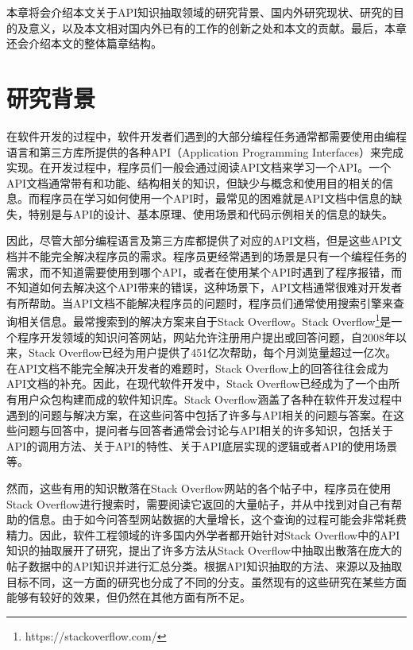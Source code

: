 本章将会介绍本文关于API知识抽取领域的研究背景、国内外研究现状、研究的目的及意义，以及本文相对国内外已有的工作的创新之处和本文的贡献。最后，本章还会介绍本文的整体篇章结构。

\section{研究背景}
在软件开发的过程中，软件开发者们遇到的大部分编程任务通常都需要使用由编程语言和第三方库所提供的各种API（Application Programming Interfaces）来完成实现。在开发过程中，程序员们一般会通过阅读API文档来学习一个API\cite{DBLP:conf/sigsoft/FucciMM19}\cite{DBLP:conf/icsm/LiLSXPLZ18}。一个API文档通常带有和功能、结构相关的知识，但缺少与概念和使用目的相关的信息\cite{DBLP:conf/se/MaalejR14}。而程序员在学习如何使用一个API时，最常见的困难就是API文档中信息的缺失，特别是与API的设计、基本原理、使用场景和代码示例相关的信息的缺失\cite{DBLP:journals/ese/RobillardD11}\cite{DBLP:journals/software/Robillard09}\cite{DBLP:journals/chinaf/FanYWYW21}\cite{DBLP:journals/tse/ZhangJRZH21}。

因此，尽管大部分编程语言及第三方库都提供了对应的API文档，但是这些API文档并不能完全解决程序员的需求\cite{DBLP:journals/tse/ZhangJRZH21}\cite{DBLP:journals/corr/abs-1907-09807}。程序员更经常遇到的场景是只有一个编程任务的需求，而不知道需要使用到哪个API，或者在使用某个API时遇到了程序报错，而不知道如何去解决这个API带来的错误\cite{DBLP:conf/kbse/HuangXXLW18}\cite{DBLP:conf/sigsoft/SadowskiSE15}\cite{DBLP:journals/ese/WuWBI19}，这种场景下，API文档通常很难对开发者有所帮助。当API文档不能解决程序员的问题时，程序员们通常使用搜索引擎来查询相关信息。最常搜索到的解决方案来自于Stack Overflow\cite{DBLP:conf/iwpc/ZhouXLTW14}。Stack Overflow\footnote{https://stackoverflow.com/}是一个程序开发领域的知识问答网站，网站允许注册用户提出或回答问题，自2008年以来，Stack Overflow已经为用户提供了451亿次帮助，每个月浏览量超过一亿次。在API文档不能完全解决开发者的难题时，Stack Overflow上的回答往往会成为API文档的补充。因此，在现代软件开发中，Stack Overflow已经成为了一个由所有用户众包构建而成的软件知识库\cite{DBLP:conf/sac/YeXLK16}\cite{王海2017社交化软件开发问答中的交互过程研究}。Stack Overflow涵盖了各种在软件开发过程中遇到的问题与解决方案，在这些问答中包括了许多与API相关的问题与答案。在这些问题与回答中，提问者与回答者通常会讨论与API相关的许多知识，包括关于API的调用方法、关于API的特性、关于API底层实现的逻辑或者API的使用场景等\cite{DBLP:conf/icalt/VenigallaLAC19}\cite{DBLP:journals/access/ZhangJRC18}\cite{DBLP:conf/wcre/AhasanuzzamanAR18}\cite{朱子骁2018基于}。

然而，这些有用的知识散落在Stack Overflow网站的各个帖子中，程序员在使用Stack Overflow进行搜索时，需要阅读它返回的大量帖子，并从中找到对自己有帮助的信息。由于如今问答型网站数据的大量增长，这个查询的过程可能会非常耗费精力\cite{DBLP:conf/sigsoft/CaiWXH00X19}\cite{和晓健2019基于实体识别的软件开发问答网站中的}。因此，软件工程领域的许多国内外学者都开始针对Stack Overflow中的API知识的抽取展开了研究，提出了许多方法从Stack Overflow中抽取出散落在庞大的帖子数据中的API知识并进行汇总分类。根据API知识抽取的方法、来源以及抽取目标不同，这一方面的研究也分成了不同的分支。虽然现有的这些研究在某些方面能够有较好的效果，但仍然在其他方面有所不足。

